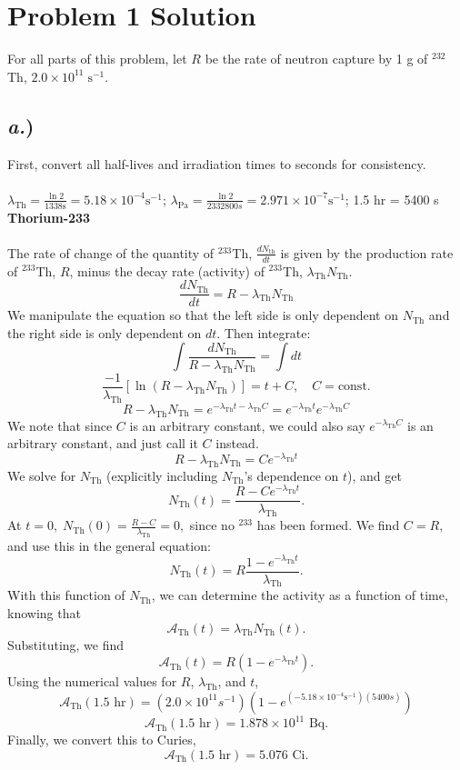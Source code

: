 \documentclass{report}
\newcommand{\tab}{\-\hspace{1.5cm}}
\begin{document}
\section*{Problem 1 Solution}

For all parts of this problem, let $R$ be the rate of neutron capture by 1 g of $^{232}$Th, $2.0 \times 10^{11} \;\text{s}^{-1}$.\\

\subsection*{\textit{a.})}
First, convert all half-lives and irradiation times to seconds for consistency.\\ 
\-\\
\tab $\lambda_{\text{Th}} = \frac{\ln{2}}{1338\text{s}} = 5.18\times10^{-4}\text{s}^{-1}$; \tab $\lambda_{\text{Pa}}=\frac{\ln{2}}{2332800s}=2.971\times10^{-7}\text{s}^{-1}$; \tab 1.5 hr = 5400 s\\

\textbf{Thorium-233}\\
\-\\
The rate of change of the quantity of $^{233}$Th, $\frac{dN_{\text{th}}}{dt}$ is given by the production rate of $^{233}$Th, $R$, minus the decay rate (activity) of $^{233}$Th, $\lambda_{\text{Th}}N_{\text{Th}}$.
$$\frac{dN_{\text{Th}}}{dt} = R - \lambda_{\text{Th}}N_{\text{Th}}$$
We manipulate the equation so that the left side is only dependent on $N_{\text{Th}}$ and the right side is only dependent on $dt$. Then integrate:
$$\int{\frac{dN_{\text{Th}}}{R-\lambda_{\text{Th}}N_{\text{Th}}}} = \int{dt}$$
$$\frac{-1}{\lambda_{\text{Th}}}[\ln(R-\lambda_{\text{Th}}N_{\text{Th}})] = t + C,\quad C=\text{const.}$$
$$R-\lambda_{\text{Th}}N_{\text{Th}} = e^{-\lambda_{\text{Th}}t -\lambda_{\text{Th}}C} = e^{-\lambda_{\text{Th}}t} e^{-\lambda_{\text{Th}}C}$$
We note that since $C$ is an arbitrary constant, we could also say $e^{-\lambda_{\text{Th}}C}$ is an arbitrary constant, and just call it $C$ instead.
$$ R-\lambda_{\text{Th}}N_{\text{Th}} = Ce^{-\lambda_{\text{Th}}t} $$
We solve for $N_{\text{Th}}$ (explicitly including $N_{\text{Th}}$'s dependence on $t$), and get
$$ N_{\text{Th}}(t) = \frac{R - Ce^{-\lambda_{\text{Th}}t}}{\lambda_{\text{Th}}} .$$
At $t=0,\; N_{\text{Th}}(0) = \frac{R - C}{\lambda_{\text{Th}}}=0,$ since no $^{233}$ has been formed. We find $C= R$, and use this in the general equation:
$$ N_{\text{Th}}(t) = R\frac{1 - e^{-\lambda_{\text{Th}}t}}{\lambda_{\text{Th}}}. $$
With this function of $N_{\text{Th}}$, we can determine the activity as a function of time, knowing that
$$ \mathcal{A}_{\text{Th}}(t) = \lambda_{\text{Th}}N_{\text{Th}}(t). $$
Substituting, we find
$$ \mathcal{A}_{\text{Th}}(t) = R(1-e^{-\lambda_{\text{Th}}t}) .$$
Using the numerical values for $R$, $\lambda_{\text{Th}}$, and $t$,
$$ \mathcal{A}_{\text{Th}}(1.5\text{ hr}) =(2.0\times10^{11}s^{-1})(1-e^{(-5.18\times10^{-4}\text{s}^{-1})(5400s)}) $$
$$ \mathcal{A}_{\text{Th}}(1.5\text{ hr}) = 1.878\times10^{11}\text{ Bq} .$$
Finally, we convert this to Curies,
$$\boxed{ \mathcal{A}_{\text{Th}}(1.5\text{ hr}) = 5.076\text{ Ci} }.$$
\end{document}
